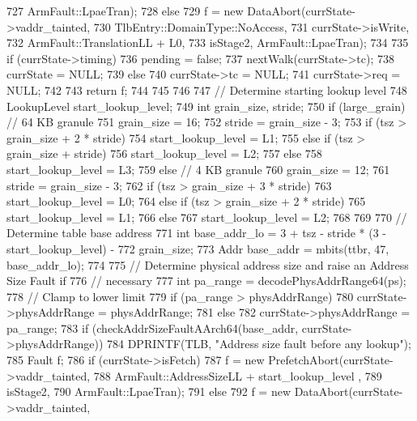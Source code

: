 \begin{DoxyCode}
{{727                                      ArmFault::LpaeTran);
728         else
729             f = new DataAbort(currState->vaddr_tainted,
730                                  TlbEntry::DomainType::NoAccess,
731                                  currState->isWrite,
732                                  ArmFault::TranslationLL + L0,
733                                  isStage2, ArmFault::LpaeTran);
734 
735         if (currState->timing) {
736             pending = false;
737             nextWalk(currState->tc);
738             currState = NULL;
739         } else {
740             currState->tc = NULL;
741             currState->req = NULL;
742         }
743         return f;
744 
745     }
746 
747     // Determine starting lookup level
748     LookupLevel start_lookup_level;
749     int grain_size, stride;
750     if (large_grain) {  // 64 KB granule
751         grain_size = 16;
752         stride = grain_size - 3;
753         if (tsz > grain_size + 2 * stride)
754             start_lookup_level = L1;
755         else if (tsz > grain_size + stride)
756             start_lookup_level = L2;
757         else
758             start_lookup_level = L3;
759     } else {  // 4 KB granule
760         grain_size = 12;
761         stride = grain_size - 3;
762         if (tsz > grain_size + 3 * stride)
763             start_lookup_level = L0;
764         else if (tsz > grain_size + 2 * stride)
765             start_lookup_level = L1;
766         else
767             start_lookup_level = L2;
768     }
769 
770     // Determine table base address
771     int base_addr_lo = 3 + tsz - stride * (3 - start_lookup_level) -
772         grain_size;
773     Addr base_addr = mbits(ttbr, 47, base_addr_lo);
774 
775     // Determine physical address size and raise an Address Size Fault if
776     // necessary
777     int pa_range = decodePhysAddrRange64(ps);
778     // Clamp to lower limit
779     if (pa_range > physAddrRange)
780         currState->physAddrRange = physAddrRange;
781     else
782         currState->physAddrRange = pa_range;
783     if (checkAddrSizeFaultAArch64(base_addr, currState->physAddrRange)) {
784         DPRINTF(TLB, "Address size fault before any lookup\n");
785         Fault f;
786         if (currState->isFetch)
787             f = new PrefetchAbort(currState->vaddr_tainted,
788                                      ArmFault::AddressSizeLL + start_lookup_level
      ,
789                                      isStage2,
790                                      ArmFault::LpaeTran);
791         else
792             f = new DataAbort(currState->vaddr_tainted,
}}
\end{DoxyCode}
